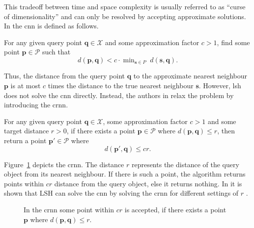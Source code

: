 \documentclass[../../../main.tex]{subfiles}
\begin{document}
This tradeoff between time and space complexity is usually referred to as ``curse of dimensionality'' and can only be resolved by accepting approximate solutions. In \cite{indyk_approximate_1998} the \gls{cnn} is defined as follows.

\begin{definition}
    For any given query point $\bm{q} \in \mathcal{X}$ and some approximation factor $c > 1$, find some point $\bm{p} \in \mathcal{P}$ such that
    \begin{equation}
        d(\bm{p},\bm{q}) < c \cdot \mathop{\text{min}}_{\bm{s} \in P} \; d(\bm{s}, \bm{q}).
    \end{equation}
\end{definition}

Thus, the distance from the query point $\bm{q}$ to the approximate nearest neighbour $\bm{p}$ is at most $c$ times the distance to the true nearest neighbour $\bm{s}$. However, \gls{lsh} does not solve the \gls{cnn} directly. Instead, the authors in \cite{indyk_approximate_1998} relax the problem by introducing the \gls{crnn}.

\begin{definition}
    For any given query point $\bm{q} \in \mathcal{X}$, some approximation factor $c > 1$ and some target distance $r > 0$, if there exists a point $\bm{p} \in \mathcal{P}$ where $d(\bm{p},\bm{q}) \leq r$, then return a point $\bm{p}' \in \mathcal{P}$ where
    \begin{equation}
        d(\bm{p}',\bm{q}) \leq cr.
    \end{equation}
\end{definition}

Figure~\ref{fig:nearest_neighbour} depicts the \gls{crnn}. The distance $r$ represents the distance of the query object from its nearest neighbour. If there is such a point, the algorithm returns points within $cr$ distance from the query object, else it returns nothing. In \cite{indyk_approximate_1998} it is shown that LSH can solve the \gls{cnn} by solving the \gls{crnn} for different settings of $r$ .

\begin{figure}[t!]
    \centering
    
    \caption[The \acrlong{crnn}]{In the \acrlong{crnn} some point within $cr$ is accepted, if there exists a point $\bm{p}$ where $d(\bm{p},\bm{q}) \leq r$.}
    \label{fig:nearest_neighbour}
\end{figure}
\end{document}

